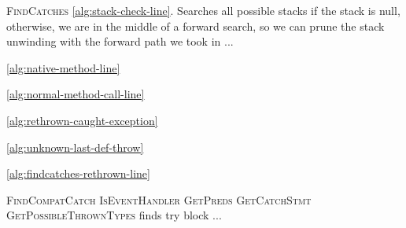 \textsc{FindCatches} \ref{alg:stack-check-line}.  Searches all possible stacks
if the stack is null, otherwise, we are in the middle of a forward
search, so we can prune the stack unwinding with the forward path we
took in ...


\ref{alg:native-method-line}

\ref{alg:normal-method-call-line}

\ref{alg:rethrown-caught-exception}

\ref{alg:unknown-last-def-throw}

\ref{alg:findcatches-rethrown-line}

\textsc{FindCompatCatch}
\textsc{IsEventHandler}
\textsc{GetPreds}
\textsc{GetCatchStmt}
\textsc{GetPossibleThrownTypes} finds try block ...
